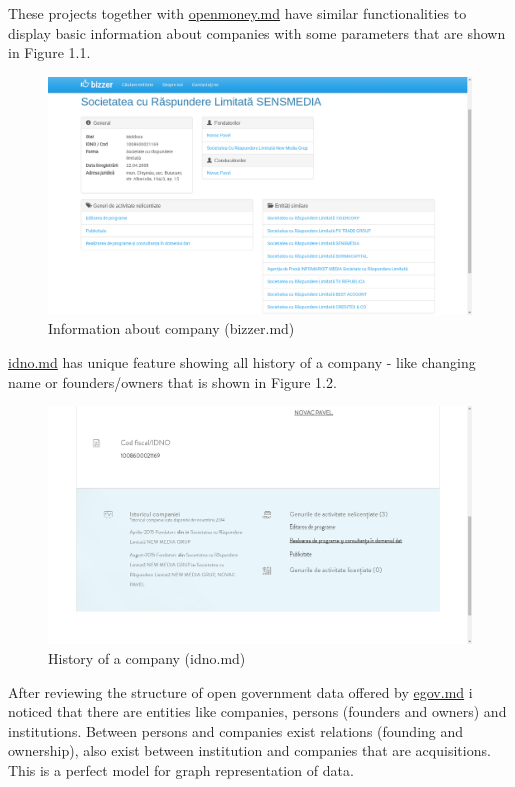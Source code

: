 \documentclass[12pt,a4paper,titlepage]{article}
\begin{document}
These projects together with \underline{openmoney.md} have similar functionalities to display basic information about companies with some parameters that are shown in Figure 1.1.


\begin{figure}[!ht] 
	\renewcommand\thefigure{1.1}
	\centering 
	\includegraphics[width=17cm]{bizzer.png} 
	\caption{ Information about company (bizzer.md) }\label{fig}
	\end{figure}
	
\underline{idno.md} has unique feature showing all history of a company - like changing name or founders/owners that is shown in Figure 1.2.

\begin{figure}[!ht] 
	\renewcommand\thefigure{1.2} %
	\centering 
	\includegraphics[width=17cm]{idno.png} 
	\caption{ History of a company (idno.md) }\label{fig}
	\end{figure}
	
	
After reviewing the structure of open government data offered by \underline{egov.md} i noticed that there are entities like companies, persons (founders and owners) and institutions. Between persons and companies exist relations (founding and ownership), also exist between institution and companies that are acquisitions. This is a perfect model for graph representation of data.\\
\end{document}
